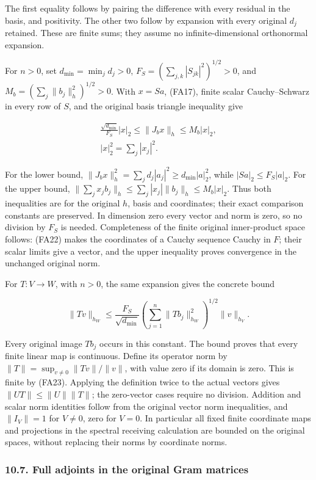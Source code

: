\documentclass[
  11pt,
]{article}
\begin{document}
The first equality follows by pairing the difference with every residual
in the basis, and positivity. The other two follow by expansion with
every original \(d_j\) retained. These are finite sums; they assume no
infinite-dimensional orthonormal expansion.

For \(n>0\), set \(d_{\min}=\min_jd_j>0\),
\(F_S=(\sum_{j,k}|S_{jk}|^2)^{1/2}>0\), and
\(M_b=(\sum_j\|b_j\|_h^2)^{1/2}>0\). With \(x=S a\), (FA17), finite
scalar Cauchy--Schwarz in every row of \(S\), and the original basis
triangle inequality give

\[
\begin{gathered}
\frac{\sqrt{d_{\min}}}{F_S}|x|_2
 \le \|J_bx\|_h
 \le M_b|x|_2, \\ |x|_2^2=\sum_j|x_j|^2.
\end{gathered}
\tag{FA22}
\]

For the lower bound,
\(\|J_bx\|_h^2=\sum_jd_j|a_j|^2\ge d_{\min}|a|_2^2\), while
\(|S a|_2\le F_S|a|_2\). For the upper bound,
\(\|\sum_jx_jb_j\|_h\le\sum_j|x_j|\|b_j\|_h\le M_b|x|_2\). Thus both
inequalities are for the original \(h\), basis and coordinates; their
exact comparison constants are preserved. In dimension zero every vector
and norm is zero, so no division by \(F_S\) is needed. Completeness of
the finite original inner-product space follows: (FA22) makes the
coordinates of a Cauchy sequence Cauchy in \(F\); their scalar limits
give a vector, and the upper inequality proves convergence in the
unchanged original norm.

For \(T:V\to W\), with \(n>0\), the same expansion gives the concrete
bound

\[
\|Tv\|_{h_W}\le
\frac{F_S}{\sqrt{d_{\min}}}
\left(\sum_{j=1}^n\|Tb_j\|_{h_W}^2\right)^{1/2}
\|v\|_{h_V}.
\tag{FA23}
\]

Every original image \(Tb_j\) occurs in this constant. The bound proves
that every finite linear map is continuous. Define its operator norm by
\(\|T\|=\sup_{v\ne0}\|Tv\|/\|v\|\), with value zero if its domain is
zero. This is finite by (FA23). Applying the definition twice to the
actual vectors gives \(\|UT\|\le\|U\|\|T\|\); the zero-vector cases
require no division. Addition and scalar norm identities follow from the
original vector norm inequalities, and \(\|I_V\|=1\) for \(V\ne0\), zero
for \(V=0\). In particular all fixed finite coordinate maps and
projections in the spectral receiving calculation are bounded on the
original spaces, without replacing their norms by coordinate norms.

\subsubsection{10.7. Full adjoints in the original Gram
matrices}\label{full-adjoints-in-the-original-gram-matrices}
\end{document}
